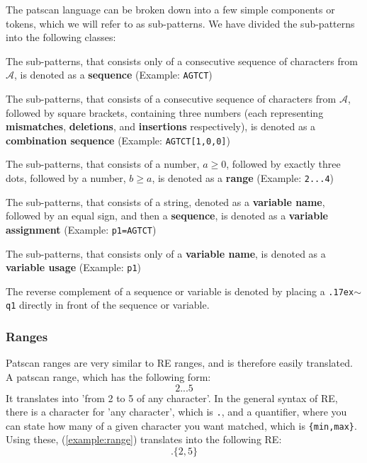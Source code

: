 \documentclass[12pt]{article}
\theoremstyle{definition}
\begin{document}
The patscan language can be broken down into a few simple components or tokens, which we will refer to as sub-patterns. We have divided the sub-patterns into the following classes:

The sub-patterns, that consists only of a consecutive sequence of characters from $\mathcal{A}$, is denoted as a \textbf{sequence} (Example: \texttt{AGTCT})

The sub-patterns, that consists of a consecutive sequence of characters from $\mathcal{A}$, followed by square brackets, containing three numbers (each representing \textbf{mismatches}, \textbf{deletions}, and \textbf{insertions} respectively), is denoted as a \textbf{combination sequence} (Example: \texttt{AGTCT[1,0,0]})

The sub-patterns, that consists of a number, $a \geq 0$, followed by exactly three dots, followed by a number, $b \geq a$, is denoted as a \textbf{range} (Example: \texttt{2...4})

The sub-patterns, that consists of a string, denoted as a \textbf{variable name}, followed by an equal sign, and then a \textbf{sequence}, is denoted as a \textbf{variable assignment} (Example: \texttt{p1=AGTCT})

The sub-patterns, that consists only of a \textbf{variable name}, is denoted as a \textbf{variable usage} (Example: \texttt{p1})

The reverse complement of a sequence or variable is denoted by placing a \texttt{{\raise.17ex\hbox{$\scriptstyle\mathtt{\sim}$}}q1} directly in front of the sequence or variable.


\subsubsection{Ranges}

Patscan ranges are very similar to RE ranges, and is therefore easily translated. A patscan range, which has the following form:
\begin{equation}
\label{example:range}
	2...5
\end{equation}
It translates into 'from 2 to 5 of any character'. In the general syntax of RE, there is a character for 'any character', which is \texttt{.}, and a quantifier, where you can state how many of a given character you want matched, which is \texttt{\{min,max\}}. Using these, (\ref{example:range}) translates into the following RE:
\begin{equation}
.\{2,5\}
\end{equation}
\end{document}
